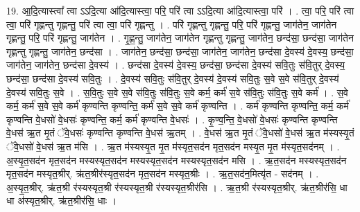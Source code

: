 \documentclass[17pt]{extarticle}
\begin{document}
19. आ॒दि॒त्यास्त्वा᳚ त्वा ऽऽदि॒त्या आ॑दि॒त्यास्त्वा॒ परि॒ परि॑ त्वा ऽऽदि॒त्या आ॑दि॒त्यास्त्वा॒ परि॑ । . त्वा॒ परि॒ परि॑ त्वा त्वा॒ परि॑ गृह्णन्तु गृह्णन्तु॒ परि॑ त्वा त्वा॒ परि॑ गृह्णन्तु । . परि॑ गृह्णन्तु गृह्णन्तु॒ परि॒ परि॑ गृह्णन्तु॒ जाग॑तेन॒ जाग॑तेन गृह्णन्तु॒ परि॒ परि॑ गृह्णन्तु॒ जाग॑तेन । . गृ॒ह्ण॒न्तु॒ जाग॑तेन॒ जाग॑तेन गृह्णन्तु गृह्णन्तु॒ जाग॑तेन॒ छन्द॑सा॒ छन्द॑सा॒ जाग॑तेन गृह्णन्तु गृह्णन्तु॒ जाग॑तेन॒ छन्द॑सा । . जाग॑तेन॒ छन्द॑सा॒ छन्द॑सा॒ जाग॑तेन॒ जाग॑तेन॒ छन्द॑सा दे॒वस्य॑ दे॒वस्य॒ छन्द॑सा॒ जाग॑तेन॒ जाग॑तेन॒ छन्द॑सा दे॒वस्य॑ । . छन्द॑सा दे॒वस्य॑ दे॒वस्य॒ छन्द॑सा॒ छन्द॑सा दे॒वस्य॑ सवि॒तुः स॑वि॒तुर् दे॒वस्य॒ छन्द॑सा॒ छन्द॑सा दे॒वस्य॑ सवि॒तुः । . दे॒वस्य॑ सवि॒तुः स॑वि॒तुर् दे॒वस्य॑ दे॒वस्य॑ सवि॒तुः स॒वे स॒वे स॑वि॒तुर् दे॒वस्य॑ दे॒वस्य॑ सवि॒तुः स॒वे । . स॒वि॒तुः स॒वे स॒वे स॑वि॒तुः स॑वि॒तुः स॒वे कर्म॒ कर्म॑ स॒वे स॑वि॒तुः स॑वि॒तुः स॒वे कर्म॑ । . स॒वे कर्म॒ कर्म॑ स॒वे स॒वे कर्म॑ कृण्वन्ति कृण्वन्ति॒ कर्म॑ स॒वे स॒वे कर्म॑ कृण्वन्ति । . कर्म॑ कृण्वन्ति कृण्वन्ति॒ कर्म॒ कर्म॑ कृण्वन्ति वे॒धसो॑ वे॒धसः॑ कृण्वन्ति॒ कर्म॒ कर्म॑ कृण्वन्ति वे॒धसः॑ । . कृ॒ण्व॒न्ति॒ वे॒धसो॑ वे॒धसः॑ कृण्वन्ति कृण्वन्ति वे॒धस॑ ऋ॒त मृ॒तं ॅवे॒धसः॑ कृण्वन्ति कृण्वन्ति वे॒धस॑ ऋ॒तम् । . वे॒धस॑ ऋ॒त मृ॒तं ॅवे॒धसो॑ वे॒धस॑ ऋ॒त म॑स्यस्यृ॒तं ॅवे॒धसो॑ वे॒धस॑ ऋ॒त म॑सि । . ऋ॒त म॑स्यस्यृ॒त मृ॒त म॑स्यृत॒सद॑न मृत॒सद॑न मस्यृ॒त मृ॒त म॑स्यृत॒सद॑नम् । . अ॒स्यृ॒त॒सद॑न मृत॒सद॑न मस्यस्यृत॒सद॑न मस्यस्यृत॒सद॑न मस्यस्यृत॒सद॑न मसि । . ऋ॒त॒सद॑न मस्यस्यृत॒सद॑न मृत॒सद॑न मस्यृत॒श्रीर्. ऋ॑त॒श्रीर॑स्यृत॒सद॑न मृत॒सद॑न मस्यृत॒श्रीः । . ऋ॒त॒सद॑न॒मित्यृ॑त - सद॑नम् । . अ॒स्यृ॒त॒श्रीर्. ऋ॑त॒श्री र॑स्यस्यृत॒श्री र॑स्यस्यृत॒श्री र॑स्यस्यृत॒श्रीर॑सि । . ऋ॒त॒श्री र॑स्यस्यृत॒श्रीर्. ऋ॑त॒श्रीर॑सि॒ धा धा अ॑स्यृत॒श्रीर्. ऋ॑त॒श्रीर॑सि॒ धाः । \newline
\end{document}
